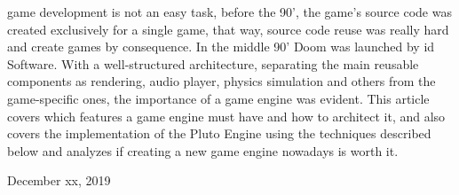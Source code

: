 
 game development is not an easy task, before the 90', the game's source code was created exclusively for a single game, that way, source code reuse was really hard and create games by consequence. In the middle 90' Doom was launched by id Software. With a well-structured architecture, separating the main reusable components as rendering, audio player, physics simulation and others from the game-specific ones, the importance of a game engine was evident\cite{GameEngineArchitecture}. This article covers which features a game engine must have and how to architect it, and also covers the implementation of the Pluto Engine using the techniques described below and analyzes if creating a new game engine nowadays is worth it.

\hfill December xx, 2019